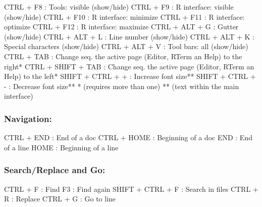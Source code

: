 \vspace{-0.5cm}
\begin{Rtables}[caption={[Visualization keyboard shortcuts]
    Visualization keyboard shortcuts},
  label=hotkey:visualization]
  CTRL  + F8          : Tools: visible (show/hide)
  CTRL  + F9          : R interface: visible (show/hide)
  CTRL  + F10         : R interface: minimize
  CTRL  + F11         : R interface: optimize
  CTRL  + F12         : R interface: maximize
  CTRL  + ALT  + G    : Gutter (show/hide)
  CTRL  + ALT  + L    : Line number (show/hide)
  CTRL  + ALT  + K    : Special characters (show/hide)
  CTRL  + ALT  + V    : Tool bars: all (show/hide)
  CTRL  + TAB         : Change seq. the active page
                        (Editor, RTerm an Help) to the right*
  CTRL  + SHIFT + TAB : Change seq. the active page
                        (Editor, RTerm an Help) to the left*
  SHIFT + CTRL + +    : Increase font size**
  SHIFT + CTRL + -    : Decrease font size**
  *  (requires more than one)
  ** (text within the main interface)
\end{Rtables}


\newpage
\subsubsection{Navigation:}

\vspace{-0.5cm}
\begin{Rtables}[caption={[Navigation keyboard shortcuts]
    Navigation keyboard shortcuts},
  label=hotkey:navigation]
  CTRL  + END  : End of a doc
  CTRL  + HOME : Beginning of a doc
  END          : End of a line
  HOME         : Beginning of a line
\end{Rtables}

\subsubsection{Search/Replace and Go:}

\vspace{-0.5cm}
\begin{Rtables}[caption={[Search/Replace and go keyboard shortcuts]
    Search/Replace and go keyboard shortcuts},
  label=hotkey:search]
  CTRL  + F        : Find
  F3               : Find again
  SHIFT + CTRL + F : Search in files
  CTRL  + R        : Replace
  CTRL  + G        : Go to line
\end{Rtables}


